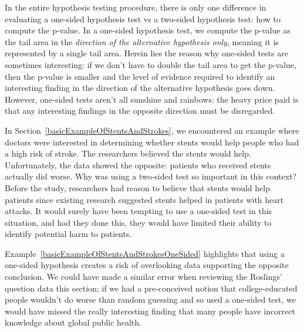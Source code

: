 In the entire hypothesis testing procedure,
there is only one difference in evaluating a one-sided
hypothesis test vs a two-sided hypothesis test:
how to compute the p-value.
In a one-sided hypothesis test, we compute the p-value as
the tail area in the \emph{direction of the alternative
hypothesis only}, meaning it is represented by a single
tail area. Herein lies the reason why one-sided tests
are sometimes interesting: if we don't have to double
the tail area to get the p-value, then the p-value is
smaller and the level of evidence required to identify
an interesting finding in the direction of the
alternative hypothesis goes down.
However, one-sided tests aren't all sunshine and rainbows:
the heavy price paid is that any interesting findings
in the opposite direction must be disregarded.

\begin{examplewrap}
\begin{nexample}{
    In Section~\ref{basicExampleOfStentsAndStrokes},
    we encountered an example where doctors were interested
    in determining whether stents would help people who had
    a high risk of stroke.
    The researchers believed the stents would help.
    Unfortunately, the data showed the opposite:
    patients who received stents actually did worse.
    Why was using a two-sided test so important in
    this context?}
    \label{basicExampleOfStentsAndStrokesOneSided}
  Before the study, researchers had reason to believe
  that stents would help patients since existing research
  suggested stents helped in patients with heart attacks.
  It would surely have been tempting to use a one-sided
  test in this situation, and had they done this,
  they would have limited their ability to identify
  potential harm to patients.
\end{nexample}
\end{examplewrap}

Example~\ref{basicExampleOfStentsAndStrokesOneSided}
highlights that using a one-sided hypothesis creates
a risk of overlooking data supporting the opposite
conclusion.
We could have made a similar error when reviewing
the Roslings' question data this section;
if we had a pre-conceived notion that
college-educated people wouldn't do worse than random
guessing and so used a one-sided test,
we would have missed the really interesting finding
that many people have incorrect knowledge about
global public health.
%    

